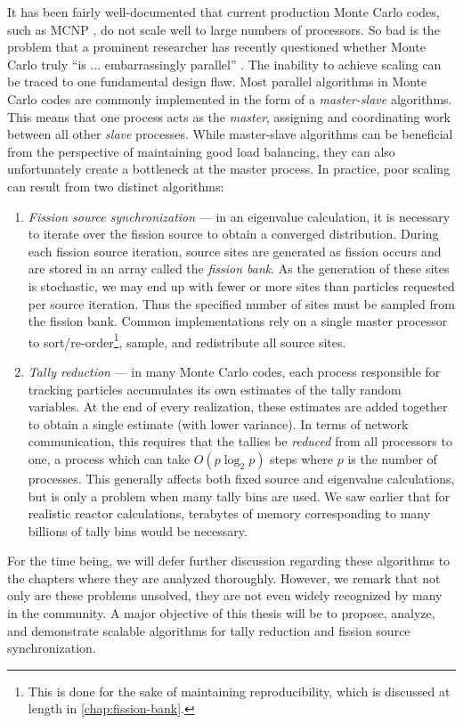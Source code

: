 It has been fairly well-documented that current production Monte Carlo codes,
such as MCNP \cite{nt-goorley-2012}, do not scale well to large numbers of
processors. So bad is the problem that a prominent researcher has recently
questioned whether Monte Carlo truly ``is ... embarrassingly parallel''
\cite{physor-hoogenboom-2012}. The inability to achieve scaling can be traced to
one fundamental design flaw. Most parallel algorithms in Monte Carlo codes are
commonly implemented in the form of a \emph{master-slave} algorithms. This means
that one process acts as the \emph{master}, assigning and coordinating work
between all other \emph{slave} processes. While master-slave algorithms can be
beneficial from the perspective of maintaining good load balancing, they can
also unfortunately create a bottleneck at the master process. In practice, poor
scaling can result from two distinct algorithms:
\begin{enumerate}
\item \emph{Fission source synchronization} --- in an eigenvalue calculation, it
  is necessary to iterate over the fission source to obtain a converged
  distribution. During each fission source iteration, source sites are generated
  as fission occurs and are stored in an array called the \emph{fission
    bank}. As the generation of these sites is stochastic, we may end up with
  fewer or more sites than particles requested per source iteration. Thus the
  specified number of sites must be sampled from the fission bank. Common
  implementations rely on a single master processor to
  sort/re-order\footnote{This is done for the sake of maintaining
    reproducibility, which is discussed at length in
    \autoref{chap:fission-bank}.}, sample, and redistribute all source sites.
\item \emph{Tally reduction} --- in many Monte Carlo codes, each process
  responsible for tracking particles accumulates its own estimates of the tally
  random variables. At the end of every realization, these estimates are added
  together to obtain a single estimate (with lower variance). In terms of
  network communication, this requires that the tallies be \emph{reduced} from
  all processors to one, a process which can take $O(p \log_2 p)$ steps where
  $p$ is the number of processes. This generally affects both fixed source and
  eigenvalue calculations, but is only a problem when many tally bins are
  used. We saw earlier that for realistic reactor calculations, terabytes of
  memory corresponding to many billions of tally bins would be necessary.
\end{enumerate}
For the time being, we will defer further discussion regarding these algorithms
to the chapters where they are analyzed thoroughly. However, we remark that not
only are these problems unsolved, they are not even widely recognized by many in
the community. A major objective of this thesis will be to propose, analyze, and
demonstrate scalable algorithms for tally reduction and fission source
synchronization.

